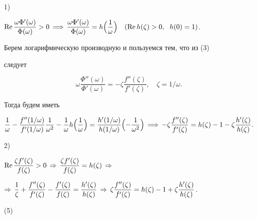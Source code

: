1) \hskip 2.5cm


$\re\dfrac{\omega\Phi'(\omega)}{\Phi(\omega)}>0


\,\Longrightarrow\,\dfrac{\omega\Phi'(\omega)}{\Phi(\omega)}=


h\Bigl(\dfrac{1}{\omega}\Bigr)\quad (\re h(\zeta)>0,\ \;h(0)=1)$.





\noindent Берем логарифмическую производную и пользуемся тем, что из (3)


следует


$$


\omega\frac{\Phi''(\omega)}{\Phi'(\omega)}=-\zeta


\frac{f''(\zeta)}{f'(\zeta)},\quad \zeta=1/\omega.


$$


Тогда будем иметь


\begin{equation}


\frac{1}{\omega}-\frac{f''(1/\omega)}{f'(1/\omega)}


\frac{1}{\omega^2}-\frac{1}{\omega}h\Bigl(\frac{1}{\omega}\Bigr)


=\frac{h'(1/\omega)}{h(1/\omega)}


\Bigl(-\frac{1}{\omega^2} \Bigr)\,\Longrightarrow\,


-\zeta\frac{f''(\zeta)}{f'(\zeta)}=


h(\zeta)-1-\zeta\frac{h'(\zeta)}{h(\zeta)}.


\end{equation}





2) \hskip 4.1mm


$\re\dfrac{\zeta f'(\zeta)}{f(\zeta)}>0\,\Rightarrow\,


\dfrac{\zeta f'(\zeta)}{f(\zeta)}=h(\zeta)\,\Rightarrow\,$





$\hfill \Rightarrow\,\dfrac{1}{\zeta}+\dfrac{f''(\zeta)}{f'(\zeta)}-


\dfrac{f'(\zeta)}{f(\zeta)}=\dfrac{h'(\zeta)}{h(\zeta)}


\,\Rightarrow\,\zeta\dfrac{f''(\zeta)}{f'(\zeta)}


=h(\zeta)-1+\zeta\dfrac{h'(\zeta)}{h(\zeta)}$.


\qquad (5)




\addtocounter{equation}{1}





